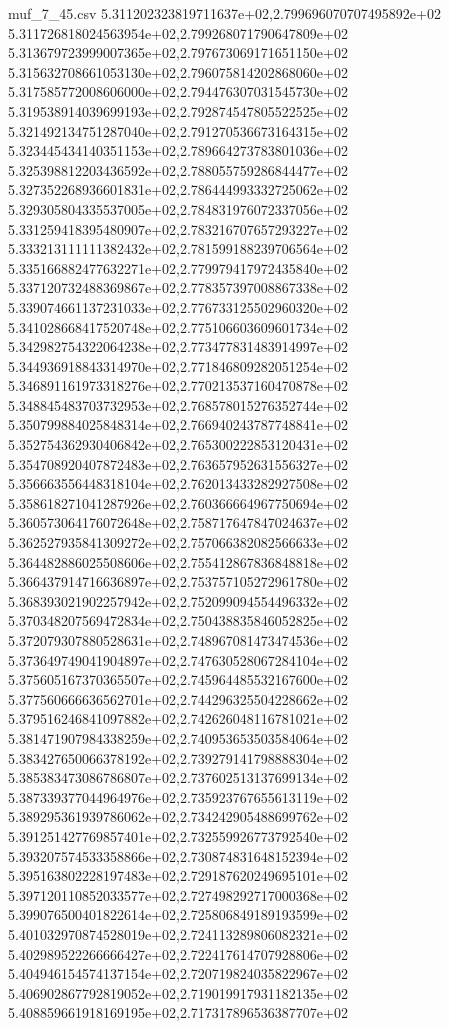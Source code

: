 \begin{filecontents*}{muf_7_45.csv}
5.311202323819711637e+02,2.799696070707495892e+02
5.311726818024563954e+02,2.799268071790647809e+02
5.313679723999007365e+02,2.797673069171651150e+02
5.315632708661053130e+02,2.796075814202868060e+02
5.317585772008606000e+02,2.794476307031545730e+02
5.319538914039699193e+02,2.792874547805522525e+02
5.321492134751287040e+02,2.791270536673164315e+02
5.323445434140351153e+02,2.789664273783801036e+02
5.325398812203436592e+02,2.788055759286844477e+02
5.327352268936601831e+02,2.786444993332725062e+02
5.329305804335537005e+02,2.784831976072337056e+02
5.331259418395480907e+02,2.783216707657293227e+02
5.333213111111382432e+02,2.781599188239706564e+02
5.335166882477632271e+02,2.779979417972435840e+02
5.337120732488369867e+02,2.778357397008867338e+02
5.339074661137231033e+02,2.776733125502960320e+02
5.341028668417520748e+02,2.775106603609601734e+02
5.342982754322064238e+02,2.773477831483914997e+02
5.344936918843314970e+02,2.771846809282051254e+02
5.346891161973318276e+02,2.770213537160470878e+02
5.348845483703732953e+02,2.768578015276352744e+02
5.350799884025848314e+02,2.766940243787748841e+02
5.352754362930406842e+02,2.765300222853120431e+02
5.354708920407872483e+02,2.763657952631556327e+02
5.356663556448318104e+02,2.762013433282927508e+02
5.358618271041287926e+02,2.760366664967750694e+02
5.360573064176072648e+02,2.758717647847024637e+02
5.362527935841309272e+02,2.757066382082566633e+02
5.364482886025508606e+02,2.755412867836848818e+02
5.366437914716636897e+02,2.753757105272961780e+02
5.368393021902257942e+02,2.752099094554496332e+02
5.370348207569472834e+02,2.750438835846052825e+02
5.372079307880528631e+02,2.748967081473474536e+02
5.373649749041904897e+02,2.747630528067284104e+02
5.375605167370365507e+02,2.745964485532167600e+02
5.377560666636562701e+02,2.744296325504228662e+02
5.379516246841097882e+02,2.742626048116781021e+02
5.381471907984338259e+02,2.740953653503584064e+02
5.383427650066378192e+02,2.739279141798888304e+02
5.385383473086786807e+02,2.737602513137699134e+02
5.387339377044964976e+02,2.735923767655613119e+02
5.389295361939786062e+02,2.734242905488699762e+02
5.391251427769857401e+02,2.732559926773792540e+02
5.393207574533358866e+02,2.730874831648152394e+02
5.395163802228197483e+02,2.729187620249695101e+02
5.397120110852033577e+02,2.727498292717000368e+02
5.399076500401822614e+02,2.725806849189193599e+02
5.401032970874528019e+02,2.724113289806082321e+02
5.402989522266666427e+02,2.722417614707928806e+02
5.404946154574137154e+02,2.720719824035822967e+02
5.406902867792819052e+02,2.719019917931182135e+02
5.408859661918169195e+02,2.717317896536387707e+02

\end{filecontents*}
